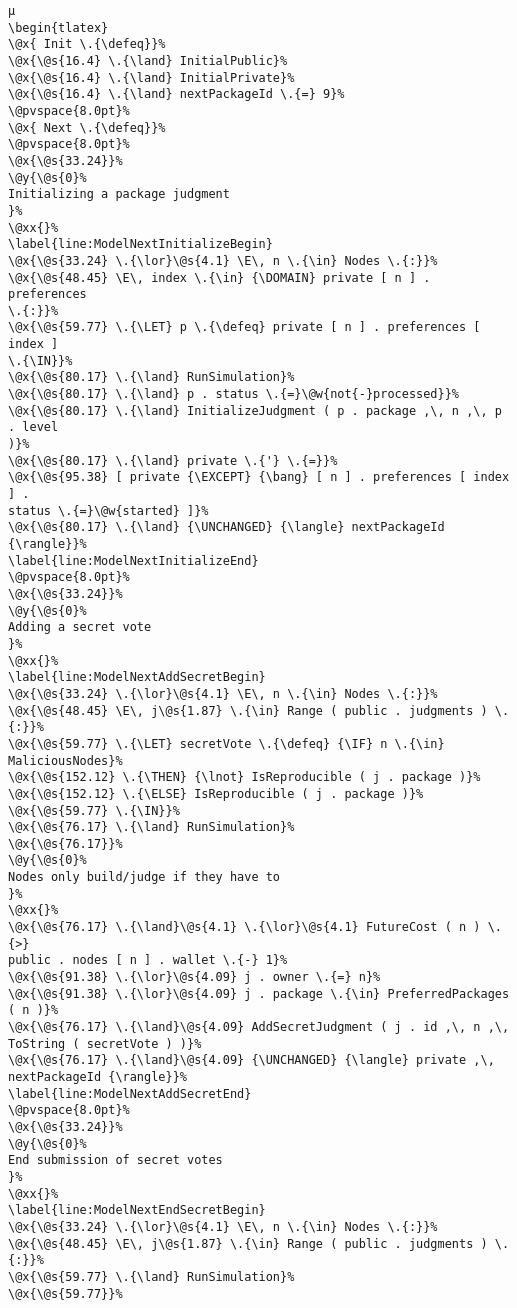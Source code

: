 \begin{lstlisting}[caption=System actor behavior in TLA\textsuperscript+ specification
    , label=lst:ModelSpec]
µ
\begin{tlatex}
\@x{ Init \.{\defeq}}%
\@x{\@s{16.4} \.{\land} InitialPublic}%
\@x{\@s{16.4} \.{\land} InitialPrivate}%
\@x{\@s{16.4} \.{\land} nextPackageId \.{=} 9}%
\@pvspace{8.0pt}%
\@x{ Next \.{\defeq}}%
\@pvspace{8.0pt}%
\@x{\@s{33.24}}%
\@y{\@s{0}%
Initializing a package judgment
}%
\@xx{}%
\label{line:ModelNextInitializeBegin}
\@x{\@s{33.24} \.{\lor}\@s{4.1} \E\, n \.{\in} Nodes \.{:}}%
\@x{\@s{48.45} \E\, index \.{\in} {\DOMAIN} private [ n ] . preferences
\.{:}}%
\@x{\@s{59.77} \.{\LET} p \.{\defeq} private [ n ] . preferences [ index ]
\.{\IN}}%
\@x{\@s{80.17} \.{\land} RunSimulation}%
\@x{\@s{80.17} \.{\land} p . status \.{=}\@w{not{-}processed}}%
\@x{\@s{80.17} \.{\land} InitializeJudgment ( p . package ,\, n ,\, p . level
)}%
\@x{\@s{80.17} \.{\land} private \.{'} \.{=}}%
\@x{\@s{95.38} [ private {\EXCEPT} {\bang} [ n ] . preferences [ index ] .
status \.{=}\@w{started} ]}%
\@x{\@s{80.17} \.{\land} {\UNCHANGED} {\langle} nextPackageId {\rangle}}%
\label{line:ModelNextInitializeEnd}
\@pvspace{8.0pt}%
\@x{\@s{33.24}}%
\@y{\@s{0}%
Adding a secret vote
}%
\@xx{}%
\label{line:ModelNextAddSecretBegin}
\@x{\@s{33.24} \.{\lor}\@s{4.1} \E\, n \.{\in} Nodes \.{:}}%
\@x{\@s{48.45} \E\, j\@s{1.87} \.{\in} Range ( public . judgments ) \.{:}}%
\@x{\@s{59.77} \.{\LET} secretVote \.{\defeq} {\IF} n \.{\in} MaliciousNodes}%
\@x{\@s{152.12} \.{\THEN} {\lnot} IsReproducible ( j . package )}%
\@x{\@s{152.12} \.{\ELSE} IsReproducible ( j . package )}%
\@x{\@s{59.77} \.{\IN}}%
\@x{\@s{76.17} \.{\land} RunSimulation}%
\@x{\@s{76.17}}%
\@y{\@s{0}%
Nodes only build/judge if they have to
}%
\@xx{}%
\@x{\@s{76.17} \.{\land}\@s{4.1} \.{\lor}\@s{4.1} FutureCost ( n ) \.{>}
public . nodes [ n ] . wallet \.{-} 1}%
\@x{\@s{91.38} \.{\lor}\@s{4.09} j . owner \.{=} n}%
\@x{\@s{91.38} \.{\lor}\@s{4.09} j . package \.{\in} PreferredPackages ( n )}%
\@x{\@s{76.17} \.{\land}\@s{4.09} AddSecretJudgment ( j . id ,\, n ,\,
ToString ( secretVote ) )}%
\@x{\@s{76.17} \.{\land}\@s{4.09} {\UNCHANGED} {\langle} private ,\,
nextPackageId {\rangle}}%
\label{line:ModelNextAddSecretEnd}
\@pvspace{8.0pt}%
\@x{\@s{33.24}}%
\@y{\@s{0}%
End submission of secret votes
}%
\@xx{}%
\label{line:ModelNextEndSecretBegin}
\@x{\@s{33.24} \.{\lor}\@s{4.1} \E\, n \.{\in} Nodes \.{:}}%
\@x{\@s{48.45} \E\, j\@s{1.87} \.{\in} Range ( public . judgments ) \.{:}}%
\@x{\@s{59.77} \.{\land} RunSimulation}%
\@x{\@s{59.77}}%

\end{lstlisting}
